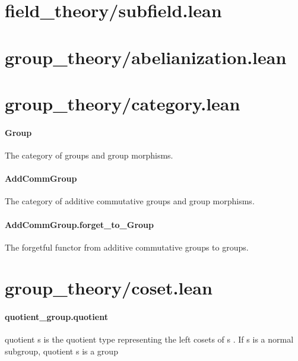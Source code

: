 \documentclass{article}
\begin{document}
\section{field\_theory/subfield.lean}\section{group\_theory/abelianization.lean}\section{group\_theory/category.lean}\paragraph{Group}
\par
The category of groups and group morphisms.
\paragraph{AddCommGroup}
\par
The category of additive commutative groups and group morphisms.
\paragraph{AddCommGroup.forget\_to\_Group}
\par
The forgetful functor from additive commutative groups to groups.
\section{group\_theory/coset.lean}\paragraph{quotient\_group.quotient}
\par
\colorbox[RGB]{253,246,227}{{{{\color[RGB]{101, 123, 131} quotient s }}}} is the quotient type representing the left cosets of 
\colorbox[RGB]{253,246,227}{{{{\color[RGB]{101, 123, 131} s }}}}.
If 
\colorbox[RGB]{253,246,227}{{{{\color[RGB]{101, 123, 131} s }}}} is a normal subgroup, 
\colorbox[RGB]{253,246,227}{{{{\color[RGB]{101, 123, 131} quotient s }}}} is a group
\end{document}
